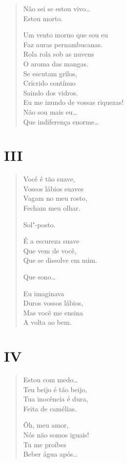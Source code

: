 {\begin{verse}
Não sei se estou vivo\ldots{}\\
Estou morto.

Um vento morno que sou eu\\
Faz auras pernambucanas.\\
Rola rola sob as nuvens\\
O aroma das mangas.\\
Se escutam grilos,\\
Cricrido contínuo\\
Saindo dos vidros.\\
Eu me inundo de vossas riquezas!\\
Não sou mais eu\ldots{}\\

Que indiferença enorme\ldots{}
\end{verse}

\pagebreak
\section*{III}

\begin{verse}
Você é tão suave,\\
Vossos lábios suaves\\
Vagam no meu rosto,\\
Fecham meu olhar.

Sol"-posto.

É a escureza suave\\
Que vem de você,\\
Que se dissolve em mim.

Que sono\ldots{}

Eu imaginava\\
Duros vossos lábios,\\
Mas você me ensina\\
A volta ao bem.
\end{verse}

\pagebreak
\section*{IV}

\begin{verse}
Estou com medo\ldots{}\\
Teu beijo é tão beijo,\\
Tua inocência é dura,\\
Feita de camélias.

Ôh, meu amor,\\
Nós não somos iguais!\\
Tu me proíbes\\
Beber água após\ldots{}


\end{verse}}
